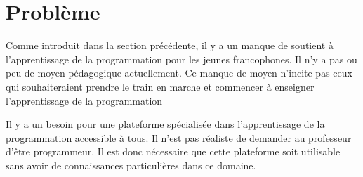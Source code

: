﻿\section{Problème}
\label{into-problem}
Comme introduit dans la section précédente, il y a un manque de soutient à l'apprentissage de la programmation pour les jeunes francophones. Il n'y a pas ou peu de moyen pédagogique actuellement. Ce manque de moyen n'incite pas ceux qui souhaiteraient prendre le train en marche et commencer à enseigner l'apprentissage de la programmation

Il y a un besoin pour une plateforme spécialisée dans l'apprentissage de la programmation accessible à tous. Il n'est pas réaliste de demander au professeur d'être programmeur. Il est donc nécessaire que cette plateforme soit utilisable sans avoir de connaissances particulières dans ce domaine.
